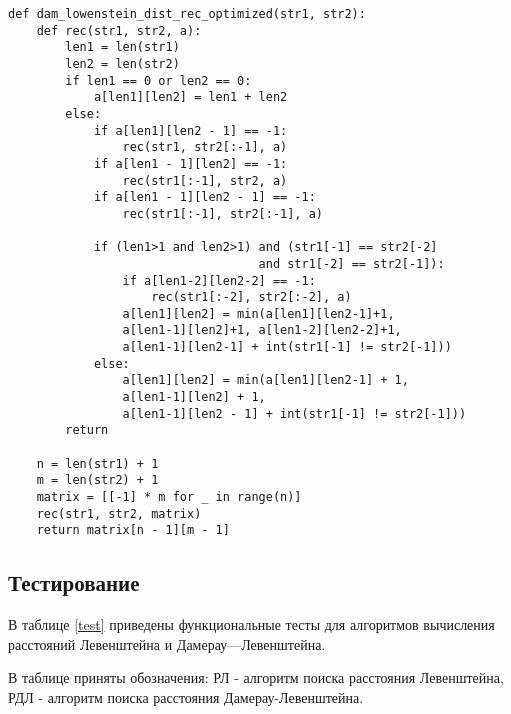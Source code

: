 \begin{lstlisting}[label=lst:dl-rec-opt,caption=Функция рекурсивного алгоритма поиска расстояния Дамерау-Левенштейна c кешированием]
def dam_lowenstein_dist_rec_optimized(str1, str2):
    def rec(str1, str2, a):
        len1 = len(str1)
        len2 = len(str2)
        if len1 == 0 or len2 == 0:
            a[len1][len2] = len1 + len2
        else:
            if a[len1][len2 - 1] == -1:
                rec(str1, str2[:-1], a)
            if a[len1 - 1][len2] == -1:
                rec(str1[:-1], str2, a)
            if a[len1 - 1][len2 - 1] == -1:
                rec(str1[:-1], str2[:-1], a)

            if (len1>1 and len2>1) and (str1[-1] == str2[-2] 
                                   and str1[-2] == str2[-1]):
                if a[len1-2][len2-2] == -1:
                    rec(str1[:-2], str2[:-2], a)
                a[len1][len2] = min(a[len1][len2-1]+1,
                a[len1-1][len2]+1, a[len1-2][len2-2]+1,
                a[len1-1][len2-1] + int(str1[-1] != str2[-1]))
            else:
                a[len1][len2] = min(a[len1][len2-1] + 1,
                a[len1-1][len2] + 1, 
                a[len1-1][len2 - 1] + int(str1[-1] != str2[-1]))
        return
        
    n = len(str1) + 1
    m = len(str2) + 1
    matrix = [[-1] * m for _ in range(n)]
    rec(str1, str2, matrix)
    return matrix[n - 1][m - 1]
\end{lstlisting}


\subsection{Тестирование}

В таблице \ref{test} приведены функциональные тесты для алгоритмов вычисления расстояний Левенштейна и Дамерау—Левенштейна.

В таблице приняты обозначения: РЛ - алгоритм поиска расстояния Левенштейна, РДЛ - алгоритм поиска расстояния Дамерау-Левенштейна. 

